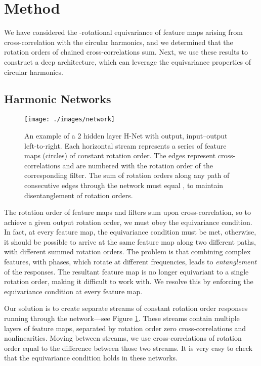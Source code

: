 \documentclass[10pt,twocolumn,letterpaper]{article}
\begin{document}
\section{Method}
We have considered the -rotational equivariance of feature maps
arising from cross-correlation with the circular harmonics, and we determined 
that the rotation orders of chained cross-correlations sum. Next, we use these 
results to construct a deep architecture, which can leverage the equivariance 
properties of circular harmonics.

\subsection{Harmonic Networks}
\begin{figure}[t]
	\texttt{[image: ./images/network]}
    \caption{An example of a 2 hidden layer H-Net with  output, 
    input--output left-to-right. Each horizontal stream represents a series 
    of feature maps (circles) of constant rotation order. The edges 
    represent cross-correlations and are numbered with the rotation 
    order of the corresponding filter. The sum of rotation orders along
    any path of consecutive edges through the network must equal ,
    to maintain disentanglement of rotation orders.}
    \label{fig:H-net_example}
\vspace{-1em}
\end{figure}
The rotation order of feature maps and filters sum upon cross-correlation, so to achieve a given output rotation order, we must obey the equivariance condition. In fact, at every feature map, the equivariance condition must be met, otherwise, it should be possible to arrive at the same feature map along two different paths, with different summed rotation orders. The problem is that combining complex features, with phases, which rotate at different frequencies, leads to \emph{entanglement} of the responses. The resultant feature map is no longer equivariant to a single rotation order, making it difficult to work with. We resolve this by enforcing the equivariance condition at every feature map.

Our solution is to create separate streams of constant rotation order responses running through the network---see Figure \ref{fig:H-net_example}. These streams contain multiple layers of feature maps, separated by rotation order zero cross-correlations and nonlinearities. Moving between streams, we use cross-correlations of rotation order equal to the difference between those two streams. It is very easy to check that the equivariance condition holds in these networks.
\end{document}
